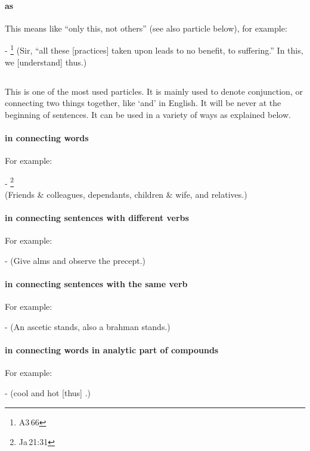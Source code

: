 \paragraph*{ as } This means like ``only this, not others'' (see also particle  below), for example:\par
- \footnote{A3\,66} (Sir, ``all these [practices] taken upon leads to no benefit, to suffering.'' In this, we [understand] thus.) \par

\subsection*{}\label{nip:ca}
This is one of the most used particles. It is mainly used to denote conjunction, or connecting two things together, like `and' in English. It will be never at the beginning of sentences. It can be used in a variety of ways as explained below.
\paragraph*{ in connecting words} For example: \par
- \footnote{Ja\,21:31} \\(Friends \& colleagues, dependants, children \& wife, and relatives.) \par
\paragraph*{ in connecting sentences with different verbs} For example: \par
-  (Give alms and observe the precept.) \par
\paragraph*{ in connecting sentences with the same verb} For example: \par
-  (An ascetic stands, also a brahman stands.) \par
\paragraph*{ in connecting words in analytic part of compounds} For example: \par
-  (cool and hot [thus] .) \par
